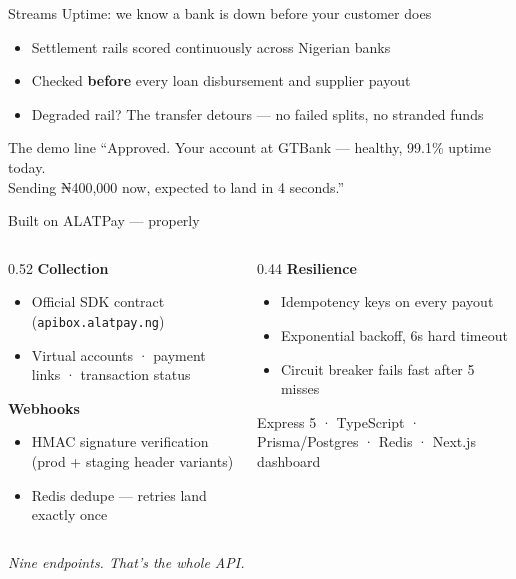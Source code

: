 \documentclass[aspectratio=169,11pt]{beamer}
\newcommand{\mutedtext}[1]{{\color{muted}#1}}
\begin{document}
\begin{frame}{Streams Uptime: we know a bank is down before your customer does}
  \vspace{0.2cm}
  \begin{itemize}
    \item Settlement rails scored continuously across Nigerian banks
    \item Checked \textbf{before} every loan disbursement and supplier payout
    \item Degraded rail? The transfer detours — no failed splits, no stranded funds
  \end{itemize}
  \vspace{0.5cm}
  \begin{exampleblock}{The demo line}
    ``Approved. Your account at GTBank — healthy, 99.1\% uptime today.\\
    Sending ₦400,000 now, expected to land in 4 seconds.''
  \end{exampleblock}
\end{frame}

\begin{frame}{Built on ALATPay — properly}
  \vspace{0.2cm}
  \begin{columns}[T]
    \begin{column}{0.52\textwidth}
      \textbf{Collection}
      \begin{itemize}
        \item Official SDK contract (\texttt{apibox.alatpay.ng})
        \item Virtual accounts · payment links · transaction status
      \end{itemize}
      \vspace{0.2cm}
      \textbf{Webhooks}
      \begin{itemize}
        \item HMAC signature verification (prod + staging header variants)
        \item Redis dedupe — retries land exactly once
      \end{itemize}
    \end{column}
    \begin{column}{0.44\textwidth}
      \textbf{Resilience}
      \begin{itemize}
        \item Idempotency keys on every payout
        \item Exponential backoff, 6s hard timeout
        \item Circuit breaker fails fast after 5 misses
      \end{itemize}
      \vspace{0.2cm}
      \mutedtext{\small Express 5 · TypeScript · Prisma/Postgres · Redis · Next.js dashboard}
    \end{column}
  \end{columns}
  \vspace{0.35cm}
  \begin{center}
    \mutedtext{\emph{Nine endpoints. That's the whole API.}}
  \end{center}
\end{frame}
\end{document}
